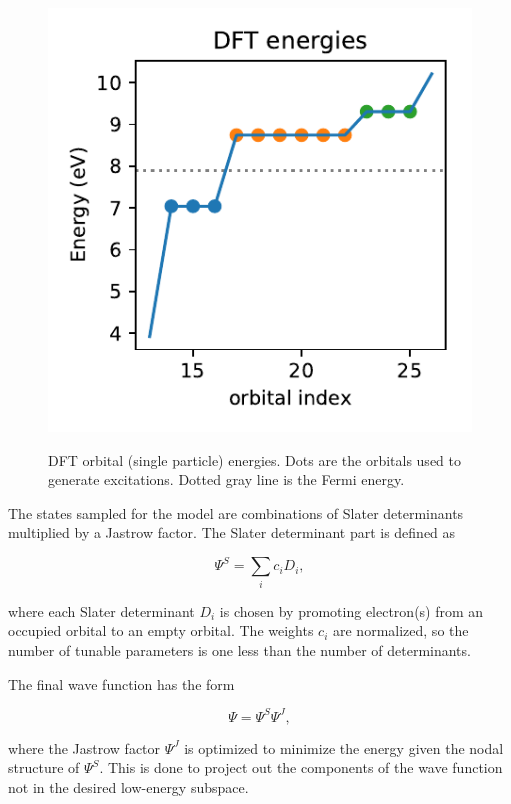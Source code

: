 \begin{figure}[h]
\begin{center}
\includegraphics{images/dft_energies_k888.pdf}
\label{fig:dft_energies}
\caption{DFT orbital (single particle) energies. 
Dots are the orbitals used to generate excitations. 
Dotted gray line is the Fermi energy.}
\end{center}
\end{figure}

The states sampled for the model are combinations of Slater determinants multiplied by a Jastrow factor.
The Slater determinant part is defined as

\begin{equation}
\Psi^S = \sum_i c_i D_i,
\end{equation}

where each Slater determinant $D_i$ is chosen by promoting electron(s) from an occupied orbital to an empty orbital.
The weights $c_i$ are normalized, so the number of tunable parameters is one less than the number of determinants.

The final wave function has the form

\begin{equation}
\Psi = \Psi^S \Psi^J,
\end{equation}

where the Jastrow factor $\Psi^J$ is optimized to minimize the energy given the nodal structure of $\Psi^S$.
This is done to project out the components of the wave function not in the desired low-energy subspace.

